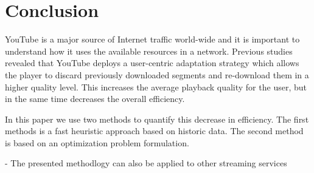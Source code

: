 
\section{Conclusion}
\label{sec:conclusion}

YouTube is a major source of Internet traffic world-wide and it is important to understand how it uses the available resources in a network.
Previous studies revealed that YouTube deploys a user-centric adaptation strategy which allows the player to discard previously downloaded segments and re-download them in a higher quality level.
This increases the average playback quality for the user, but in the same time decreases the overall efficiency.

In this paper we use two methods to quantify this decrease in efficiency. 
The first methods is a fast heuristic approach based on historic data.
The second method is based on an optimization problem formulation.






 - The presented methodlogy can also be applied to other streaming services